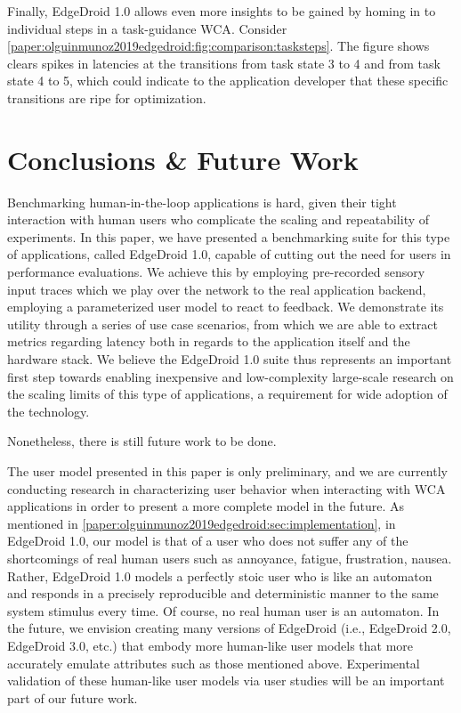 Finally, EdgeDroid 1.0 allows even more insights to be gained by homing in to individual steps in a task-guidance \gls{WCA}. Consider \cref{paper:olguinmunoz2019edgedroid:fig:comparison:tasksteps}.
The figure shows clears spikes in latencies at the transitions from task state 3 to 4 and from task state 4 to 5, which could indicate to the application developer that these specific transitions are ripe for optimization.

\section{Conclusions \& Future Work}\label{paper:olguinmunoz2019edgedroid:sec:conclusions}

Benchmarking human-in-the-loop applications is hard, given their tight interaction with human users who complicate the scaling and repeatability of experiments.
In this paper, we have presented a benchmarking suite for this type of applications, called EdgeDroid 1.0, capable of cutting out the need for users in performance evaluations.
We achieve this by employing pre-recorded sensory input traces which we play over the network to the real application backend, employing a parameterized user model to react to feedback.
We demonstrate its utility through a series of use case scenarios, from which we are able to extract metrics regarding latency both in regards to the application itself and the hardware stack.
We believe the EdgeDroid 1.0 suite thus represents an important first step towards enabling inexpensive and low-complexity large-scale research on the scaling limits of this type of applications, a requirement for wide adoption of the technology.

Nonetheless, there is still future work to be done.

The user model presented in this paper is only preliminary, and we are currently conducting research in characterizing user behavior when interacting with \gls{WCA} applications in order to present a more complete model in the future.
As mentioned in \cref{paper:olguinmunoz2019edgedroid:sec:implementation}, in EdgeDroid 1.0, our model is that of a user who does not suffer any of the shortcomings of real human users such as annoyance, fatigue, frustration, nausea.
Rather, EdgeDroid 1.0 models a perfectly stoic user who is like an automaton and responds in a precisely reproducible and deterministic manner to the same system stimulus every time.
Of course, no real human user is an automaton.
In the future, we envision creating  many versions of EdgeDroid (i.e., EdgeDroid 2.0, EdgeDroid 3.0, etc.) that embody more human-like user models that more accurately emulate attributes such as those mentioned above.
Experimental validation of these human-like user models via user studies will be an important part of our future work.

